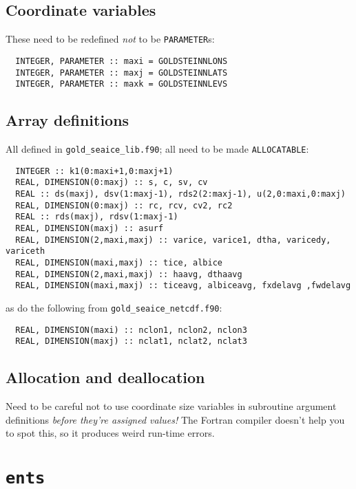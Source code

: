 \documentclass[a4paper,10pt,article]{memoir}
\begin{document}
\section{Coordinate variables}

These need to be redefined \emph{not} to be \texttt{PARAMETER}s:

\begin{verbatim}
  INTEGER, PARAMETER :: maxi = GOLDSTEINNLONS
  INTEGER, PARAMETER :: maxj = GOLDSTEINNLATS
  INTEGER, PARAMETER :: maxk = GOLDSTEINNLEVS
\end{verbatim}

\section{Array definitions}

All defined in \texttt{gold\_seaice\_lib.f90}; all need to be made
\texttt{ALLOCATABLE}:

\begin{verbatim}
  INTEGER :: k1(0:maxi+1,0:maxj+1)
  REAL, DIMENSION(0:maxj) :: s, c, sv, cv
  REAL :: ds(maxj), dsv(1:maxj-1), rds2(2:maxj-1), u(2,0:maxi,0:maxj)
  REAL, DIMENSION(0:maxj) :: rc, rcv, cv2, rc2
  REAL :: rds(maxj), rdsv(1:maxj-1)
  REAL, DIMENSION(maxj) :: asurf
  REAL, DIMENSION(2,maxi,maxj) :: varice, varice1, dtha, varicedy, variceth
  REAL, DIMENSION(maxi,maxj) :: tice, albice
  REAL, DIMENSION(2,maxi,maxj) :: haavg, dthaavg
  REAL, DIMENSION(maxi,maxj) :: ticeavg, albiceavg, fxdelavg ,fwdelavg
\end{verbatim}

as do the following from \texttt{gold\_seaice\_netcdf.f90}:

\begin{verbatim}
  REAL, DIMENSION(maxi) :: nclon1, nclon2, nclon3
  REAL, DIMENSION(maxj) :: nclat1, nclat2, nclat3
\end{verbatim}

\section{Allocation and deallocation}

Need to be careful not to use coordinate size variables in subroutine
argument definitions \emph{before they're assigned values!}  The
Fortran compiler doesn't help you to spot this, so it produces weird
run-time errors.


\chapter{\texttt{ents}}
\end{document}
